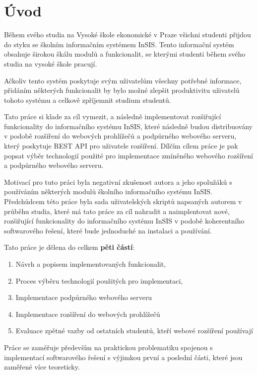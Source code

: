 \chapter*{Úvod}

Během svého studia na Vysoké škole ekonomické v Praze všichni studenti přijdou do styku se školním informačním systémem InSIS. Tento informační systém obsahuje širokou škálu modulů a funkcionalit, se kterými studenti během svého studia na vysoké škole pracují.

Ačkoliv tento systém poskytuje svým uživatelům všechny potřebné informace, přidáním některých funkcionalit by bylo možné zlepšit produktivitu uživatelů tohoto systému a celkově zpříjemnit studium studentů.

Tato práce si klade za cíl vymezit, a následně implementovat rozšiřující funkcionality do informačního systému InSIS, které následně budou distribuovány v podobě rozšíření do webových prohlížečů a podpůrného webového serveru, který poskytuje REST API pro uživatele rozšíření. Dílčím cílem práce je pak popsat výběr technologií použité pro implementace zmíněného webového rozšíření a podpůrného webového serveru.

Motivací pro tuto práci byla negativní zkušenost autora a jeho spolužáků s používáním některých modulů školního informačního systému InSIS. 
Předchůdcem této práce byla sada uživatelských skriptů napsaných autorem v průběhu studia, které má tato práce za cíl nahradit a naimplentovat nové, rozšiřující funkcionality do informačního systému InSIS v podobě koherentního softwarového řešení, které bude jednoduché na instalaci a používání.

Tato práce je dělena do celkem \textbf{pěti částí}: 

\begin{enumerate}
    \item Návrh a popisem implementovaných funkcionalit,
    \item Proces výběru technologií použitých pro implementaci,
    \item Implementace podpůrného webového serveru
    \item Implementace rozšíření do webových prohlížečů
    \item Evaluace zpětné vazby od ostatních studentů, kteří webové rozšíření používají
\end{enumerate}

Práce se zaměřuje především na praktickou problematiku spojenou s implementací softwarového řešení s výjimkou první a poslední části, které jsou zaměřené více teoreticky.

